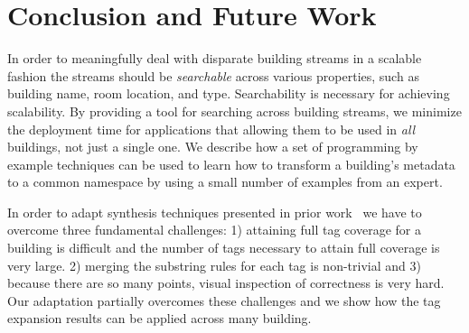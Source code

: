 \section{Conclusion and Future Work}


In order to meaningfully deal with disparate building streams in a scalable 
fashion the streams should be \emph{searchable} across various properties, such
as building name, room location, and type.
Searchability is necessary for achieving scalability.  By providing a tool for
searching across building streams, we minimize the deployment time for applications that 
allowing them to be used in \emph{all} buildings, not just a single one.  
We describe how a set of programming by example techniques can be used to
learn how to transform a building's metadata 
to a common namespace by using a small number of examples from an expert. 

In order to adapt synthesis techniques presented in prior work~\cite{Gulwani:2011} 
we have to overcome
three fundamental challenges: 1) attaining full tag coverage for a building
is difficult and the number of tags necessary to attain full coverage is very large.
2) merging the substring rules for each tag is non-trivial and 3) because there are so
many points, visual inspection of correctness is very hard.
Our adaptation partially overcomes these challenges and we show how the tag expansion results can
be applied across many building.




